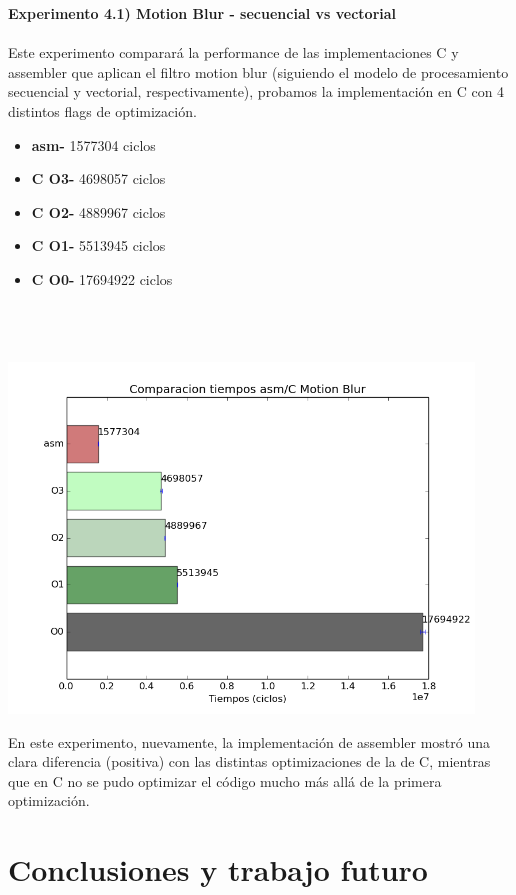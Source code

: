 \documentclass[a4paper]{article}
\begin{document}
\textbf{Experimento 4.1) Motion Blur - secuencial vs vectorial}\\ \\

Este experimento comparar\'{a} la performance de las implementaciones C y assembler que aplican el filtro motion blur (siguiendo el modelo de procesamiento secuencial y vectorial, respectivamente), probamos la implementaci\'{o}n en C con 4 distintos flags de optimizaci\'{o}n.

\begin{itemize}

\item \textbf{asm-}  1577304 ciclos
\item \textbf{C O3-} 4698057 ciclos\\
\item \textbf{C O2-} 4889967 ciclos\\
\item \textbf{C O1-} 5513945 ciclos\\
\item \textbf{C O0-} 17694922 ciclos\\\\ \\ \\

\end{itemize}

\includegraphics[width=350pt]{imagenes/CompCasm4.png}

En este experimento, nuevamente, la implementaci\'{o}n de assembler mostr\'{o} una clara diferencia (positiva) con las distintas optimizaciones de la de C, mientras que en C no se pudo optimizar el c\'{o}digo mucho m\'{a}s all\'{a} de la primera optimizaci\'{o}n.

\newpage

%

\section{Conclusiones y trabajo futuro}
\end{document}
